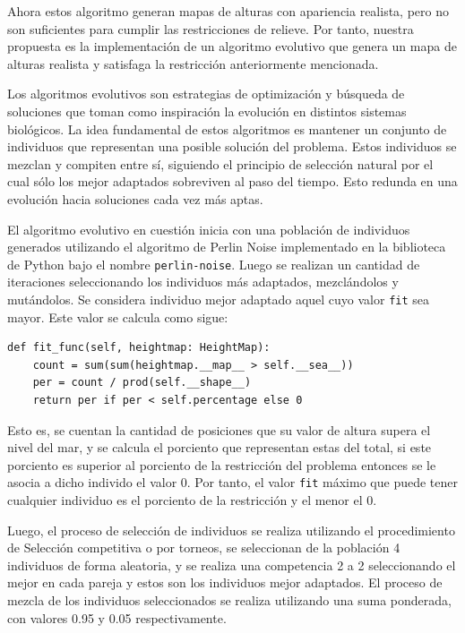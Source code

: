Ahora estos algoritmo generan mapas de alturas con apariencia realista, pero no son suficientes para cumplir las restricciones de relieve. Por tanto, nuestra propuesta es la implementación de un algoritmo evolutivo que genera un mapa de alturas realista y satisfaga la restricción anteriormente mencionada.

Los algoritmos evolutivos son estrategias de optimización y búsqueda de soluciones que toman como inspiración la evolución en distintos sistemas biológicos. La idea fundamental de estos algoritmos es mantener un conjunto de individuos que representan una posible solución del problema. Estos individuos se mezclan y compiten entre sí, siguiendo el principio de selección natural por el cual sólo los mejor adaptados sobreviven al paso del tiempo. Esto redunda en una evolución hacia soluciones cada vez más aptas. 

El algoritmo evolutivo en cuestión inicia con una población de individuos generados utilizando el algoritmo de Perlin Noise implementado en la biblioteca de Python bajo el nombre \verb|perlin-noise|.	Luego se realizan un cantidad de iteraciones seleccionando los individuos más adaptados, mezclándolos y mutándolos.  Se considera individuo mejor adaptado aquel cuyo valor \verb|fit| sea mayor. Este valor se calcula como sigue:

\begin{verbatim}
def fit_func(self, heightmap: HeightMap):
	count = sum(sum(heightmap.__map__ > self.__sea__))
	per = count / prod(self.__shape__)
	return per if per < self.percentage else 0
\end{verbatim}

Esto es, se cuentan la cantidad de posiciones que su valor de altura supera el nivel del mar, y se calcula el porciento que representan estas del total, si este porciento es superior al porciento de la restricción del problema entonces se le asocia a dicho individo el valor 0.  Por tanto, el valor \verb|fit| máximo que puede tener cualquier individuo es el porciento de la restricción y el menor el 0.

Luego, el proceso de selección de individuos se realiza utilizando el procedimiento de Selección competitiva o por torneos, se seleccionan de la población 4 individuos de forma aleatoria, y se realiza una competencia 2 a 2 seleccionando el mejor en cada pareja y estos son los individuos mejor adaptados. El proceso de mezcla de los individuos seleccionados se realiza utilizando una suma ponderada, con valores 0.95 y 0.05 respectivamente. 

